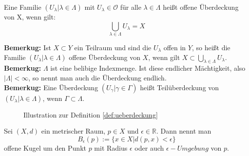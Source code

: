 \begin{Def}\label{def:ueberdeckung}
	Eine Familie \( (U_{\lambda} | \lambda \in \Lambda) \) mit \(U_{\lambda} \in \mathcal{O} \) für alle \( \lambda \in \Lambda \) heißt 	offene Überdeckung von X, wenn gilt:
	\[ \bigcup_{\lambda \in \Lambda } U_{\lambda} = X \]
\end{Def}
\textbf{Bemerkug:} Ist \(X \subset Y\) ein Teilraum und sind die \(U_{\lambda}\) offen in \(Y\), so heißt die Familie \( (U_{\lambda} | \lambda \in \Lambda) \) offene Überdeckung von
\(X\), wenn gilt \(X \subset \bigcup_{\lambda \in \Lambda} U_{\lambda}\).
\\
\textbf{Bemerkug:} \(\Lambda\) ist eine belibige Indexmenge. Ist diese endlicher Mächtigkeit, also \(|\Lambda| < \infty\), so nennt man auch die Überdeckung endlich. 
\\
\textbf{Bemerkug:} Eine Überdeckung \( (U_{\gamma} | \gamma \in \Gamma) \)  heißt Teilüberdeckung von \( (U_{\lambda} | \lambda \in \Lambda ) \), wenn \(\Gamma \subset \Lambda\). 

\begin{figure}[ht]%
	\centering
	\def\svgwidth{150}
	
	\caption{Illustration zur Definition \ref{def:ueberdeckung}}
	\label{fig:ueberdeckung}
\end{figure}

\begin{Def}
	Sei \((X,d)\) ein metrischer Raum, \(p \in X\) und \(\epsilon \in \mathbb{R}\). Dann nennt man
	\[ B_{\epsilon}(p) := \{ x \in X | d(p,x) < \epsilon \} \]
	offene Kugel um den Punkt \(p\) mit Radius \(\epsilon\) oder auch \(\epsilon-Umgebung\) von \(p\).
\end{Def}
